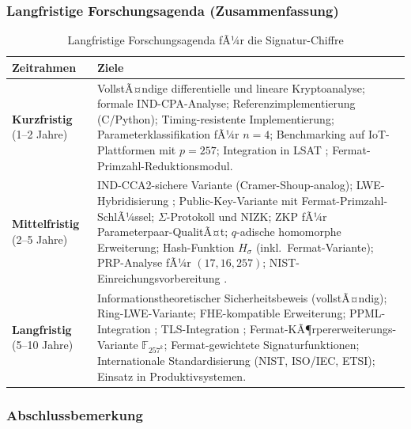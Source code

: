 ﻿\documentclass[a4paper,12pt]{scrreprt}
\theoremstyle{definition}
\begin{document}
\subsubsection{Langfristige Forschungsagenda (Zusammenfassung)}

\begin{table}[ht]
\centering
\caption{Langfristige Forschungsagenda fÃ¼r die Signatur-Chiffre}
\begin{tabular}{@{}p{3.5cm}p{8.5cm}@{}}
\toprule
\textbf{Zeitrahmen} & \textbf{Ziele} \\
\midrule
\textbf{Kurzfristig} (1--2 Jahre) &
VollstÃ¤ndige differentielle und lineare Kryptoanalyse;
formale IND-CPA-Analyse;
Referenzimplementierung (C/Python);
Timing-resistente Implementierung;
Parameterklassifikation fÃ¼r $n = 4$;
Benchmarking auf IoT-Plattformen mit $p = 257$;
Integration in LSAT \cite{Epp26d};
Fermat-Primzahl-Reduktionsmodul.
\\[0.5ex]
\textbf{Mittelfristig} (2--5 Jahre) &
IND-CCA2-sichere Variante (Cramer-Shoup-analog);
LWE-Hybridisierung \cite{Reg05};
Public-Key-Variante mit Fermat-Primzahl-SchlÃ¼ssel;
$\Sigma$-Protokoll und NIZK;
ZKP fÃ¼r Parameterpaar-QualitÃ¤t;
$q$-adische homomorphe Erweiterung;
Hash-Funktion $H_\sigma$ (inkl.\ Fermat-Variante);
PRP-Analyse fÃ¼r $(17, 16, 257)$;
NIST-Einreichungsvorbereitung \cite{NIST22}.
\\[0.5ex]
\textbf{Langfristig} (5--10 Jahre) &
Informationstheoretischer Sicherheitsbeweis (vollstÃ¤ndig);
Ring-LWE-Variante;
FHE-kompatible Erweiterung;
PPML-Integration \cite{GLP+21};
TLS-Integration \cite{Res18};
Fermat-KÃ¶rpererweiterungs-Variante $\mathbb{F}_{257^k}$;
Fermat-gewichtete Signaturfunktionen;
Internationale Standardisierung (NIST, ISO/IEC, ETSI);
Einsatz in Produktivsystemen.
\\
\bottomrule
\end{tabular}
\end{table}

\subsubsection{Abschlussbemerkung}
\end{document}
